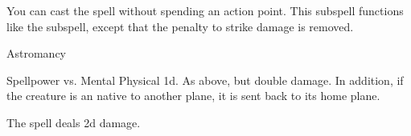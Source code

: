 You can cast the spell without spending an action point.
This subspell functions like the  subspell, except that the penalty to strike damage is removed.
\begin{spellsection}{Astromancy}
\begin{spellheader}
\end{spellheader}
\begin{spellcontent}
\begin{spelltargetinginfo}
\end{spelltargetinginfo}
\begin{spelleffects}
\begin{spellattack}{Spellpower vs. Mental}
\spellsuccess Physical  \plus1d.
\spellcritical
As above, but double damage.
In addition, if the creature is an  native to another plane, it is sent back to its home plane.
\end{spellattack}
\end{spelleffects}
\end{spellcontent}
\begin{spellfooter}
\end{spellfooter}
\begin{spellsubcontent}
\begin{spellcantrip}
The spell deals \minus2d damage.
\end{spellcantrip}
\end{spellsubcontent}
\end{spellsection}
